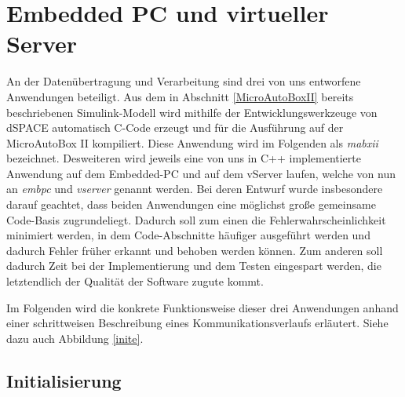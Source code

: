 \documentclass[fontsize = 12pt, paper = a4]{scrreprt}
\begin{document}
\newpage

    

   


 









  
 



   


\section{Embedded PC und virtueller Server}


An der Datenübertragung und Verarbeitung sind drei von uns entworfene Anwendungen beteiligt. Aus dem in Abschnitt \ref{MicroAutoBoxII} bereits beschriebenen Simulink-Modell wird mithilfe der Entwicklungswerkzeuge von dSPACE automatisch C-Code erzeugt und für die Ausführung auf der MicroAutoBox II kompiliert. Diese Anwendung wird im Folgenden als \textit{mabxii} bezeichnet. Desweiteren wird jeweils eine von uns in C++ implementierte Anwendung auf dem Embedded-PC und auf dem vServer laufen, welche von nun an \textit{embpc} und \textit{vserver} genannt werden. Bei deren Entwurf wurde insbesondere darauf geachtet, dass beiden Anwendungen eine möglichst große gemeinsame Code-Basis zugrundeliegt. Dadurch soll zum einen die Fehlerwahrscheinlichkeit minimiert werden, in dem Code-Abschnitte häufiger ausgeführt werden und dadurch Fehler früher erkannt und behoben werden können.
Zum anderen soll dadurch Zeit bei der Implementierung und dem Testen eingespart werden, die letztendlich der Qualität der Software zugute kommt. 

Im Folgenden wird die konkrete Funktionsweise dieser drei Anwendungen anhand einer schrittweisen Beschreibung eines Kommunikationsverlaufs erläutert. Siehe dazu auch Abbildung \ref{inite}.



\subsection{Initialisierung}
\end{document}
